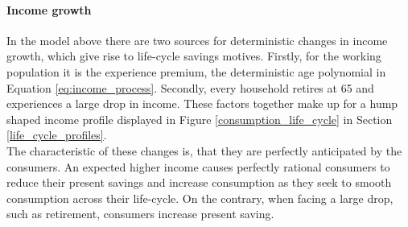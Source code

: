 \documentclass[a4paper,12pt,legno]{article}
\begin{document}
\paragraph{Income growth} In the model above there are two sources for deterministic changes in income growth, which give rise to life-cycle savings motives. Firstly, for the working population it is the experience premium, the deterministic age polynomial in Equation \ref{eq:income_process}. Secondly, every household retires at 65 and experiences a large drop in income. These factors together make up for a hump shaped income profile displayed in Figure \ref{consumption_life_cycle} in Section \ref{life_cycle_profiles}. \\ The characteristic of these changes is, that they are perfectly anticipated by the consumers. An expected higher income causes perfectly rational consumers to reduce their present savings and increase consumption as they seek to smooth consumption across their life-cycle. On the contrary, when facing a large drop, such as retirement, consumers increase present saving. 
\end{document}
